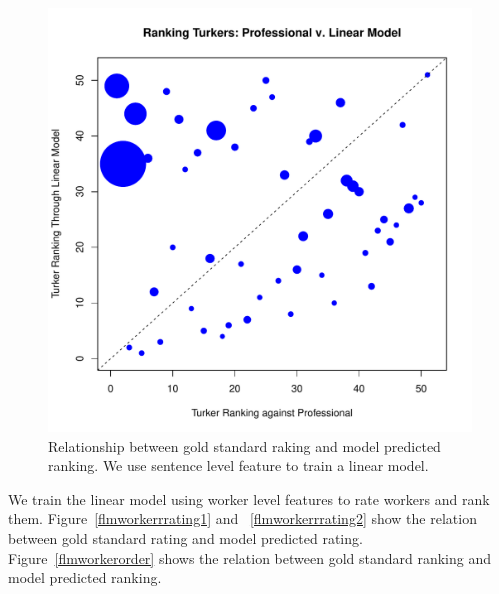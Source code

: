 \documentclass[11pt]{article}
\begin{document}
\begin{figure}[htbp]
  \centering
  \includegraphics[width=\linewidth]{Senfeature/senrorder}
  \caption{Relationship between gold standard raking and model predicted ranking. We use sentence level feature to train a linear model. }
    \label{flmsenrorder}
\end{figure}
We train the linear model using worker level features to rate workers and rank them. Figure~\ref{flmworkerrrating1} and ~\ref{flmworkerrrating2} show the relation between gold standard rating and model predicted rating. Figure~\ref{flmworkerorder} shows the relation between gold standard ranking and model predicted ranking.
\end{document}
